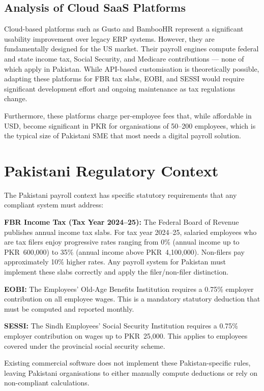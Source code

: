 \documentclass[12pt,a4paper]{report}
\begin{document}
\subsection{Analysis of Cloud SaaS Platforms}

Cloud-based platforms such as Gusto and BambooHR represent a significant usability improvement over legacy ERP systems. However, they are fundamentally designed for the US market. Their payroll engines compute federal and state income tax, Social Security, and Medicare contributions --- none of which apply in Pakistan. While API-based customisation is theoretically possible, adapting these platforms for FBR tax slabs, EOBI, and SESSI would require significant development effort and ongoing maintenance as tax regulations change.

Furthermore, these platforms charge per-employee fees that, while affordable in USD, become significant in PKR for organisations of 50--200 employees, which is the typical size of Pakistani SME that most needs a digital payroll solution.

\section{Pakistani Regulatory Context}

The Pakistani payroll context has specific statutory requirements that any compliant system must address:

\textbf{FBR Income Tax (Tax Year 2024--25):} The Federal Board of Revenue publishes annual income tax slabs. For tax year 2024--25, salaried employees who are tax filers enjoy progressive rates ranging from 0\% (annual income up to PKR~600,000) to 35\% (annual income above PKR~4,100,000). Non-filers pay approximately 10\% higher rates. Any payroll system for Pakistan must implement these slabs correctly and apply the filer/non-filer distinction.

\textbf{EOBI:} The Employees' Old-Age Benefits Institution requires a 0.75\% employer contribution on all employee wages. This is a mandatory statutory deduction that must be computed and reported monthly.

\textbf{SESSI:} The Sindh Employees' Social Security Institution requires a 0.75\% employer contribution on wages up to PKR~25,000. This applies to employees covered under the provincial social security scheme.

Existing commercial software does not implement these Pakistan-specific rules, leaving Pakistani organisations to either manually compute deductions or rely on non-compliant calculations.
\end{document}
